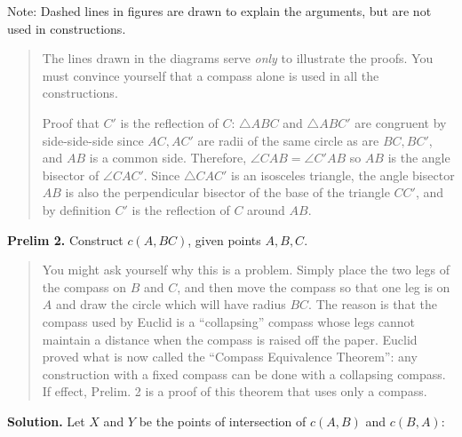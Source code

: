 Note: Dashed lines in figures are drawn to explain the arguments, but are not used in constructions.  
\begin{quote}
The lines drawn in the diagrams serve \emph{only} to illustrate the proofs. You must convince yourself that a compass alone is used in all the constructions.

Proof that $C'$ is the reflection of $C$: $\triangle ABC$ and $\triangle ABC'$ are congruent by side-side-side since $AC,AC'$ are radii of the same circle as are $BC,BC'$, and $AB$ is a common side. Therefore, $\angle CAB = \angle C'AB$ so $AB$ is the angle bisector of $\angle CAC'$. Since $\triangle CAC'$ is an isosceles triangle, the angle bisector $AB$ is also the perpendicular bisector of the base of the triangle $CC'$, and by definition $C'$ is the reflection of $C$ around $AB$.
\end{quote}


\textbf{Prelim 2.} Construct $c(A,BC)$, given points $A,B,C$.

\begin{quote}
You might ask yourself why this is a problem. Simply place the two legs of the compass on $B$ and $C$, and then move the compass so that one leg is on $A$ and draw the circle which will have radius $BC$. The reason is that the compass used by Euclid is a ``collapsing'' compass whose legs cannot maintain a distance when the compass is raised off the paper. Euclid proved what is now called the ``Compass Equivalence Theorem'': any construction with a fixed compass can be done with a collapsing compass. If effect, Prelim. 2 is a proof of this theorem that uses only a compass.
\end{quote}

\textbf{Solution.} Let $X$ and $Y$ be the points of intersection of $c(A,B)$ and $c(B,A)$:

\begin{center}
\vspace*{-6pt}
\end{center}


